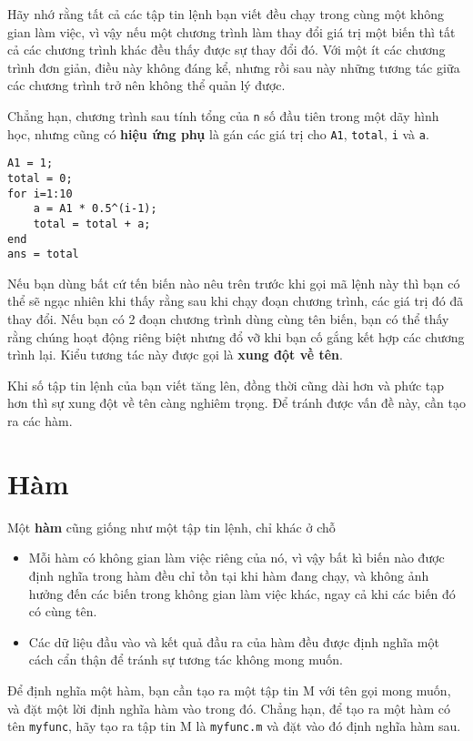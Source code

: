 \documentclass[12pt]{book}
\begin{document}
Hãy nhớ rằng tất cả các tập tin lệnh bạn viết đều chạy trong cùng
một không gian làm việc, vì vậy nếu một chương trình làm thay đổi 
giá trị một biến thì tất cả các chương trình khác đều thấy được
sự thay đổi đó. Với một ít các chương trình đơn giản, điều này
không đáng kể, nhưng rồi sau này những tương tác giữa các chương
trình trở nên không thể quản lý được.

Chẳng hạn, chương trình sau tính tổng của {\tt n} số đầu tiên
trong một dãy hình học, nhưng cũng có {\bf hiệu ứng phụ} là 
gán các giá trị cho {\tt A1}, {\tt total}, {\tt i} và {\tt a}.

\begin{verbatim}
A1 = 1;
total = 0;
for i=1:10
    a = A1 * 0.5^(i-1);
    total = total + a;
end
ans = total
\end{verbatim}

Nếu bạn dùng bất cứ tến biến nào nêu trên trước khi gọi mã lệnh này
thì bạn có thể sẽ ngạc nhiên khi thấy rằng sau khi chạy đoạn 
chương trình, các giá trị đó đã thay đổi. Nếu bạn có 2 đoạn chương
trình dùng cùng tên biến, bạn có thể thấy rằng chúng hoạt động
riêng biệt nhưng đổ vỡ khi bạn cố gắng kết hợp các chương trình lại.
Kiểu tương tác này được gọi là {\bf xung đột về tên}.

Khi số tập tin lệnh của bạn viết tăng lên, đồng thời cũng dài hơn
và phức tạp hơn thì sự xung đột về tên càng nghiêm trọng. Để tránh
được vấn đề này, cần tạo ra các hàm.


\section{Hàm}
\label{functions}

Một {\bf hàm} cũng giống như một tập tin lệnh, chỉ khác ở chỗ

\begin{itemize}

\item Mỗi hàm có không gian làm việc riêng của nó, vì vậy bất kì
biến nào được định nghĩa trong hàm đều chỉ tồn tại khi hàm đang
chạy, và không ảnh hưởng đến các biến trong không gian làm việc khác,
ngay cả khi các biến đó có cùng tên.

\item Các dữ liệu đầu vào và kết quả đầu ra của hàm đều được định
nghĩa một cách cẩn thận để tránh sự tương tác không mong muốn.

\end{itemize}

Để định nghĩa một hàm, bạn cần tạo ra một tập tin M với tên gọi
mong muốn, và đặt một lời định nghĩa hàm vào trong đó. Chẳng hạn, để
tạo ra một hàm có tên {\tt myfunc}, hãy tạo ra tập tin M là {\tt myfunc.m}
và đặt vào đó định nghĩa hàm sau.
\end{document}
